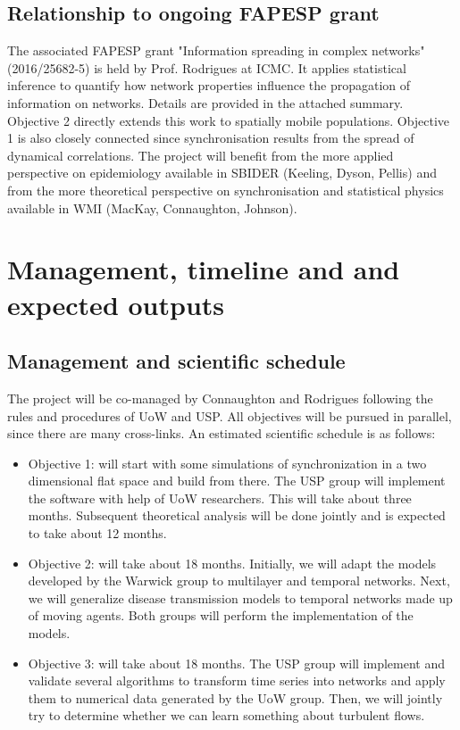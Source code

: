 \subsection{Relationship to ongoing FAPESP grant}

The associated FAPESP grant  "Information spreading in complex 
networks" (2016/25682-5) is held by Prof. Rodrigues at ICMC. It applies 
statistical inference to quantify how network properties 
influence the propagation of information on networks. Details are
provided in the attached summary. Objective 2 directly extends this work to 
spatially mobile populations. Objective 1 is also closely connected since
synchronisation results from the spread of dynamical correlations. The project will benefit 
from the more applied perspective on epidemiology available 
in SBIDER (Keeling, Dyson, Pellis) and from the more theoretical perspective on synchronisation
and statistical physics available in WMI (MacKay, Connaughton, Johnson).

\section{Management, timeline and and expected outputs}
\label{sec-timeline}
\subsection{Management and scientific schedule}
The project will be co-managed by Connaughton and Rodrigues following the 
rules and procedures of UoW and USP. All objectives will be pursued in parallel, 
since there are many cross-links. An estimated scientific schedule is as
follows:

\begin{itemize}
\itemsep\myitemsep
\item {\hvnb Objective 1:} will  start with some simulations of synchronization in a two 
dimensional flat space and build from there. The USP group will implement the software 
with help of UoW researchers. This will take about three 
months. Subsequent theoretical analysis will be done jointly and is expected to take about 12 
months.

\item {\hvnb Objective 2:}  will take about 18 months. Initially, we will adapt the 
models developed by the Warwick group to multilayer and temporal networks. 
Next, we will generalize disease transmission models to temporal networks made 
up of moving agents. Both groups will perform the implementation of the models.

\item {\hvnb Objective 3:} will take about 18 months. 
The USP group will implement and validate several algorithms to 
transform time series into networks and apply them to numerical data generated 
by the UoW group.  Then, we will jointly try to determine whether we can learn
something about turbulent flows.
\end{itemize}

